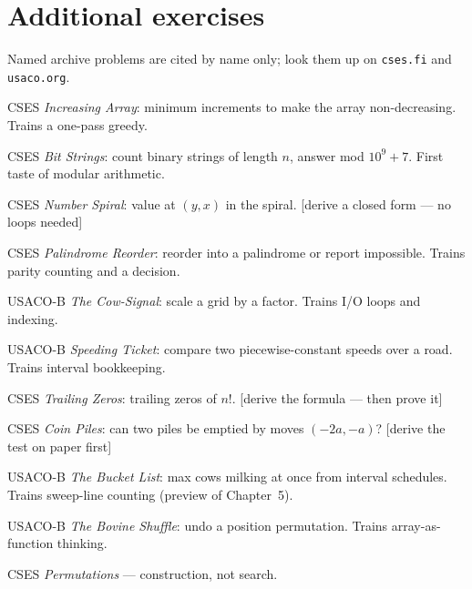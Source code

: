 \section{Additional exercises}
Named archive problems are cited by name only; look them up on
\texttt{cses.fi} and \texttt{usaco.org}.
\begin{exercise}[easy] CSES \emph{Increasing Array}: minimum increments to
make the array non-decreasing. Trains a one-pass greedy.
\end{exercise}
\begin{exercise}[easy] CSES \emph{Bit Strings}: count binary strings of
length $n$, answer mod $10^9+7$. First taste of modular arithmetic.
\end{exercise}
\begin{exercise}[easy] CSES \emph{Number Spiral}: value at $(y,x)$ in the
spiral. [derive a closed form --- no loops needed]
\end{exercise}
\begin{exercise}[easy] CSES \emph{Palindrome Reorder}: reorder into a
palindrome or report impossible. Trains parity counting and a decision.
\end{exercise}
\begin{exercise}[easy] USACO-B \emph{The Cow-Signal}: scale a grid by a
factor. Trains I/O loops and indexing.
\end{exercise}
\begin{exercise}[easy] USACO-B \emph{Speeding Ticket}: compare two
piecewise-constant speeds over a road. Trains interval bookkeeping.
\end{exercise}
\begin{exercise}[medium] CSES \emph{Trailing Zeros}: trailing zeros of
$n!$. [derive the formula --- then prove it]
\end{exercise}
\begin{exercise}[medium] CSES \emph{Coin Piles}: can two piles be emptied
by moves $(-2a,-a)$? [derive the test on paper first]
\end{exercise}
\begin{exercise}[medium] USACO-B \emph{The Bucket List}: max cows
milking at once from interval schedules. Trains sweep-line counting
(preview of Chapter~5).
\end{exercise}
\begin{exercise}[medium] USACO-B \emph{The Bovine Shuffle}: undo a
position permutation. Trains array-as-function thinking.
\end{exercise}
\begin{exercise}[easy] CSES \emph{Permutations} --- construction, not search. \end{exercise}
